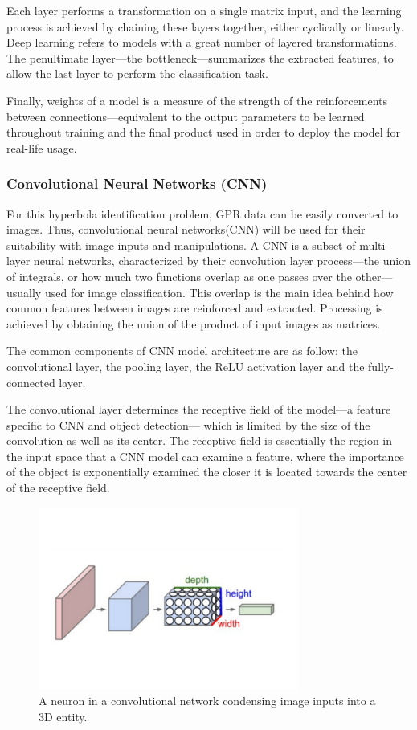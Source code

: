 \documentclass[se,blockletter]{uw-wkrpt}
\begin{document}
Each layer performs a transformation on a single matrix input, and the learning process is achieved by chaining these layers together, either cyclically or linearly. Deep learning refers to models with a great number of layered transformations. The penultimate layer---the bottleneck---summarizes the extracted features, to allow the last layer to perform the classification task.

Finally, weights of a model is a measure of the strength of the reinforcements between connections---equivalent to the output parameters to be learned throughout training and the final product used in order to deploy the model for real-life usage.

\subsubsection{Convolutional Neural Networks (CNN)}
For this hyperbola identification problem, GPR data can be easily converted to images. Thus, convolutional neural networks(CNN) will be used for their suitability with image inputs and manipulations. A CNN is a subset of multi-layer neural networks, characterized by their convolution layer process---the union of integrals, or how much two functions overlap as one passes over the other---usually used for image classification. This overlap is the main idea behind how common features between images are reinforced and extracted. Processing is achieved by obtaining the union of the product of input images as matrices. \cite{ref:cs231n_cnn}

The common components of CNN model architecture are as follow: the convolutional layer, the pooling layer, the ReLU activation layer and the fully-connected layer.

The convolutional layer determines the receptive field of the model---a feature specific to CNN and object detection--- which is limited by the size of the convolution as well as its center. The receptive field is essentially the region in the input space that a CNN model can examine a feature, where the importance of the object is exponentially examined the closer it is located towards the center of the receptive field.  

\begin{figure}
  \centering
  \includegraphics[height=6cm]{convolutional-neuron}
  \caption{A neuron in a convolutional network condensing image inputs into a 3D entity.~\cite{ref:}}
  \label{fig:cnn-neuron}
\end{figure}
\end{document}
